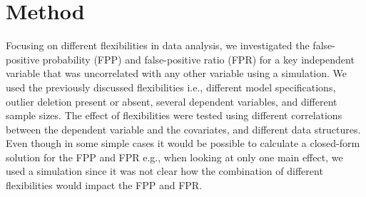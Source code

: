 \section{Method}
Focusing on different flexibilities in data analysis, we investigated the false-positive probability (FPP) and false-positive ratio (FPR) for a key independent variable that was uncorrelated with any other variable using a simulation. We used the previously discussed flexibilities i.e., different model specifications, outlier deletion present or absent, several dependent variables, and different sample sizes. The effect of flexibilities were tested using different correlations between the dependent variable and the covariates, and different data structures. Even though in some simple cases it would be possible to calculate a closed-form solution for the FPP and FPR e.g., when looking at only one main effect, we used a simulation since it was not clear how the combination of different flexibilities would impact the FPP and FPR.\\


